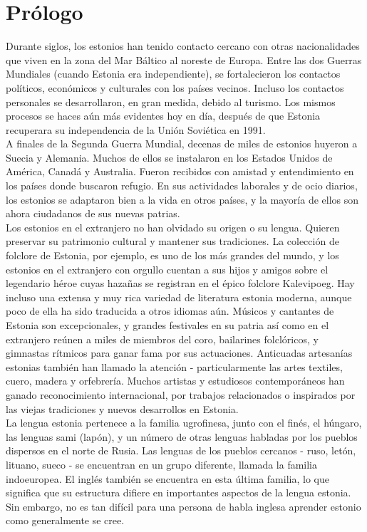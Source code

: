 \section{Prólogo}

Durante siglos, los estonios han tenido contacto cercano con otras nacionalidades que viven en la zona del Mar Báltico al noreste de Europa. Entre las dos Guerras Mundiales (cuando Estonia era independiente), se fortalecieron los contactos políticos, económicos y culturales con los países vecinos. Incluso los contactos personales se desarrollaron, en gran medida, debido al turismo. Los mismos procesos se haces aún más evidentes hoy en día, después de que Estonia recuperara su independencia de la Unión Soviética en 1991.\\

A finales de la Segunda Guerra Mundial, decenas de miles de estonios huyeron a Suecia y Alemania. Muchos de ellos se instalaron en los Estados Unidos de América, Canadá y Australia. Fueron recibidos con amistad y entendimiento en los países donde buscaron refugio. En sus actividades laborales y de ocio diarios, los estonios se adaptaron bien a la vida en otros países, y la mayoría de ellos son ahora ciudadanos de sus nuevas patrias.\\

Los estonios en el extranjero no han olvidado su origen o su lengua. Quieren preservar su patrimonio cultural y mantener sus tradiciones. La colección de folclore de Estonia, por ejemplo, es uno de los más grandes del mundo, y los estonios en el extranjero con orgullo cuentan a sus hijos y amigos sobre el legendario héroe cuyas hazañas se registran en el épico folclore Kalevipoeg. Hay incluso una extensa y muy rica variedad de literatura estonia moderna, aunque poco de ella ha sido traducida a otros idiomas aún. Músicos y cantantes de Estonia son excepcionales, y grandes festivales en su patria así como en el extranjero reúnen a miles de miembros del coro, bailarines folclóricos, y gimnastas rítmicos para ganar fama por sus actuaciones. Anticuadas artesanías estonias también han llamado la atención - particularmente las artes textiles, cuero, madera y orfebrería. Muchos artistas y estudiosos contemporáneos han ganado reconocimiento internacional, por trabajos relacionados o inspirados por las viejas tradiciones y nuevos desarrollos en Estonia.\\

La lengua estonia pertenece a la familia ugrofinesa, junto con el finés, el húngaro, las lenguas sami (lapón), y un número de otras lenguas habladas por los pueblos dispersos en el norte de Rusia. Las lenguas de los pueblos cercanos - ruso, letón, lituano, sueco - se encuentran en un grupo diferente, llamada la familia indoeuropea. El inglés también se encuentra en esta última familia, lo que significa que su estructura difiere en importantes aspectos de la lengua estonia. Sin embargo, no es tan difícil para una persona de habla inglesa aprender estonio como generalmente se cree.\\

